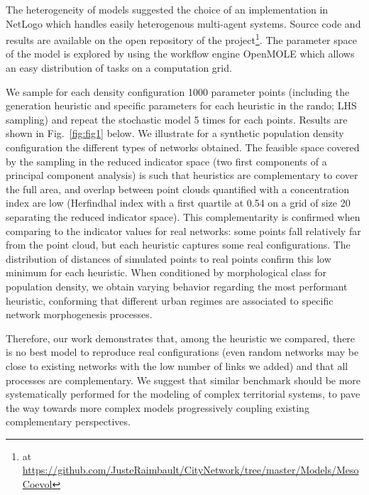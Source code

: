 \documentclass[letterpaper]{article}
\begin{document}
The heterogeneity of models suggested the choice of an implementation in NetLogo which handles easily heterogenous multi-agent systems. Source code and results are available on the open repository of the project\footnote{at \url{https://github.com/JusteRaimbault/CityNetwork/tree/master/Models/MesoCoevol}}. The parameter space of the model is explored by using the workflow engine OpenMOLE \citep{reuillon2013openmole} which allows an easy distribution of tasks on a computation grid.


We sample for each density configuration 1000 parameter points (including the generation heuristic and specific parameters for each heuristic in the rando; LHS sampling) and repeat the stochastic model 5 times for each points. Results are shown in Fig.~\ref{fig:fig1} below. We illustrate for a synthetic population density configuration the different types of networks obtained. The feasible space covered by the sampling in the reduced indicator space (two first components of a principal component analysis) is such that heuristics are complementary to cover the full area, and overlap between point clouds quantified with a concentration index are low (Herfindhal index with a first quartile at 0.54 on a grid of size 20 separating the reduced indicator space). This complementarity is confirmed when comparing to the indicator values for real networks: some points fall relatively far from the point cloud, but each heuristic captures some real configurations. The distribution of distances of simulated points to real points confirm this low minimum for each heuristic. When conditioned by morphological class for population density, we obtain varying behavior regarding the most performant heuristic, conforming that different urban regimes are associated to specific network morphogenesis processes.

Therefore, our work demonstrates that, among the heuristic we compared, there is no best model to reproduce real configurations (even random networks may be close to existing networks with the low number of links we added) and that all processes are complementary. We suggest that similar benchmark should be more systematically performed for the modeling of complex territorial systems, to pave the way towards more complex models progressively coupling existing complementary perspectives.










\footnotesize

\end{document}
